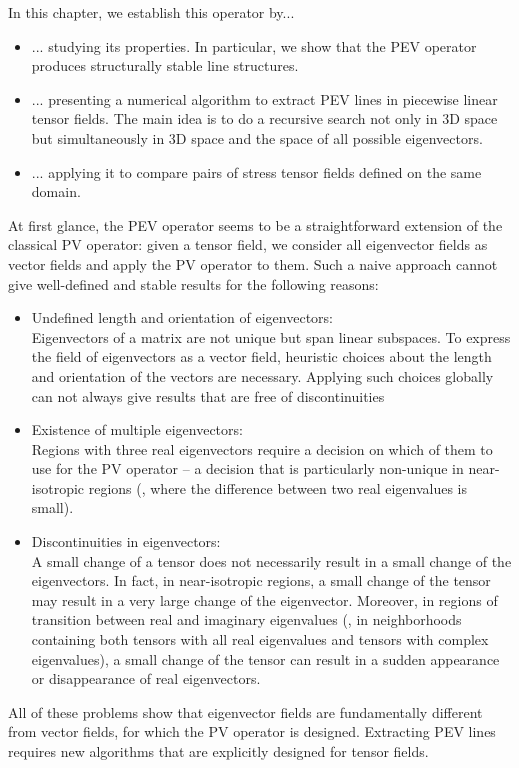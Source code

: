 %
In this chapter, we establish this operator by...
%
\begin{itemize}
    \item
    ... studying its properties.
    In particular, we show that the \ac{PEV} operator produces structurally stable
    line structures.
    \item
    ... presenting a numerical algorithm to extract \ac{PEV} lines in piecewise
    linear tensor fields.
    The main idea is to do a recursive search not only in \ac{3D} space but
    simultaneously in \ac{3D} space and the space of all possible eigenvectors.
    \item
    ... applying it to compare pairs of stress tensor fields defined on the same
    domain.
\end{itemize}
%
At first glance, the \ac{PEV} operator seems to be a straightforward extension
of the classical \ac{PV} operator:
%
given a tensor field, we consider all eigenvector fields as vector fields and
apply the \ac{PV} operator to them.
%
Such a naive approach cannot give well-defined and stable results for the
following reasons:
%
\begin{itemize}
    \item Undefined length and orientation of eigenvectors:\\
    Eigenvectors of a matrix are not unique but span linear subspaces.
    To express the field of eigenvectors as a vector field, heuristic
    choices about the length and orientation of the vectors are necessary.
    Applying such choices globally can not always give results that are free of
    discontinuities
    \item Existence of multiple eigenvectors:\\
    Regions with three real eigenvectors require a decision on which of them to
    use for the \ac{PV} operator -- a decision that is particularly non-unique
    in near-isotropic regions
    (\ie, where the difference between two real eigenvalues is small).
    \item Discontinuities in eigenvectors:\\
    A small change of a tensor does not necessarily result in a small change of
    the eigenvectors.
    In fact, in near-isotropic regions, a small change of the tensor may result
    in a very large change of the eigenvector.
    Moreover, in regions of transition between real and imaginary eigenvalues
    (\ie, in neighborhoods containing both tensors with all real eigenvalues and
    tensors with complex eigenvalues), a small change of the tensor can result
    in a sudden appearance or disappearance of real eigenvectors.
\end{itemize}
%
All of these problems show that eigenvector fields are fundamentally different
from vector fields, for which the \ac{PV} operator is designed.
%
Extracting \ac{PEV} lines requires new algorithms that are explicitly designed for
tensor fields.
%

